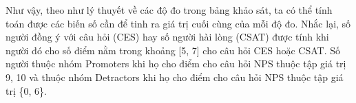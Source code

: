 Như vậy, theo như lý thuyết về các độ đo trong bảng khảo sát, ta có thể tính toán được các biến số cần để tinh ra giá trị cuối cùng của mỗi độ đo.
Nhắc lại, số người đồng ý với câu hỏi (CES) hay số người hài lòng (CSAT) được tính khi người đó cho số điểm nằm trong khoảng [5, 7] cho câu hỏi CES 
hoặc CSAT. Số người thuộc nhóm Promoters khi họ cho điểm cho câu hỏi NPS thuộc tập giá trị {9, 10} và thuộc nhóm Detractors khi họ cho điểm cho câu hỏi 
NPS thuộc tập giá trị \{0, 6\}.
\begin{table}[H]
    \def\arraystretch{1.5}%
    \centering
    \caption{Bảng kết quả tính toán mỗi câu hỏi}
\end{table}
